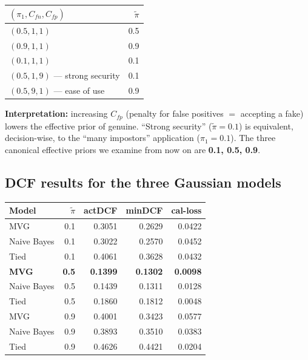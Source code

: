 \documentclass[11pt,a4paper]{article}
\begin{document}
\begin{table}[H]
\centering
\begin{tabular}{lr}
\toprule
$(\pi_1, C_{fn}, C_{fp})$ & $\tilde{\pi}$ \\
\midrule
$(0.5, 1, 1)$                          & 0.5 \\
$(0.9, 1, 1)$                          & 0.9 \\
$(0.1, 1, 1)$                          & 0.1 \\
$(0.5, 1, 9)$ --- strong security      & 0.1 \\
$(0.5, 9, 1)$ --- ease of use          & 0.9 \\
\bottomrule
\end{tabular}
\end{table}

\textbf{Interpretation:} increasing $C_{fp}$ (penalty for false
positives $=$ accepting a fake) lowers the effective prior of genuine.
``Strong security'' ($\tilde{\pi}=0.1$) is equivalent, decision-wise,
to the ``many impostors'' application ($\pi_1=0.1$). The three
canonical effective priors we examine from now on are
\textbf{0.1, 0.5, 0.9}.

\subsection{DCF results for the three Gaussian models}

\begin{table}[H]
\centering
\begin{tabular}{lrrrr}
\toprule
Model         & $\tilde{\pi}$ & actDCF & minDCF & cal-loss \\
\midrule
MVG           & 0.1 & 0.3051 & 0.2629 & 0.0422 \\
Naive Bayes   & 0.1 & 0.3022 & 0.2570 & 0.0452 \\
Tied          & 0.1 & 0.4061 & 0.3628 & 0.0432 \\
\midrule
\textbf{MVG}  & \textbf{0.5} & \textbf{0.1399} & \textbf{0.1302} & \textbf{0.0098} \\
Naive Bayes   & 0.5 & 0.1439 & 0.1311 & 0.0128 \\
Tied          & 0.5 & 0.1860 & 0.1812 & 0.0048 \\
\midrule
MVG           & 0.9 & 0.4001 & 0.3423 & 0.0577 \\
Naive Bayes   & 0.9 & 0.3893 & 0.3510 & 0.0383 \\
Tied          & 0.9 & 0.4626 & 0.4421 & 0.0204 \\
\bottomrule
\end{tabular}
\end{table}
\end{document}
